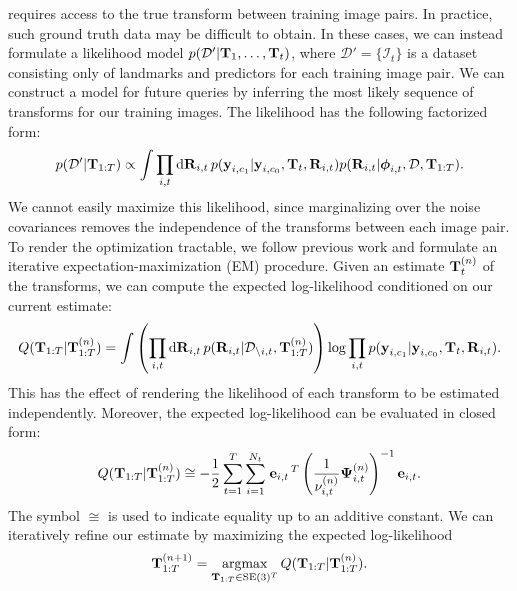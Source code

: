  requires access to the true transform between
training image pairs.  In practice, such ground truth data may be difficult
to obtain.  In these cases, we can instead formulate a likelihood model $p(\mathcal{D}' \vert
\boldsymbol{\mathbf{T}}_1, \dots, \boldsymbol{\mathbf{T}}_t)$, where $\mathcal{D}' = \{\mathcal{I}_t\}$ is a dataset consisting only of
landmarks and predictors for each training image pair. We can construct a model
for future queries by inferring the most likely sequence of transforms for our
training images.  The likelihood has the following factorized form:
\begin{equation}
  p(\mathcal{D}' \vert \boldsymbol{\mathbf{T}}_{1:T}) \propto \int \prod_{i,t}
  \mathrm{d}\boldsymbol{\mathbf{R}}_{i,t}\,
  p(\boldsymbol{\mathbf{y}}_{i, c_1} \vert \boldsymbol{\mathbf{y}}_{i, c_0}, 
    \boldsymbol{\mathbf{T}}_t, \boldsymbol{\mathbf{R}}_{i,t}) p(\boldsymbol{\mathbf{R}}_{i,t}\vert \boldsymbol{\mathbf{\phi}}_{i,t},
    \mathcal{D}, \boldsymbol{\mathbf{T}}_{1:T}).
\end{equation}
We cannot easily maximize this likelihood, since marginalizing over the
noise covariances removes the independence of the transforms between
each image pair. To render the optimization tractable, we follow previous work \citep{VegaBrown:2013fv} and formulate an iterative expectation-maximization (EM)
procedure. Given an estimate $\boldsymbol{\mathbf{T}}_{t}^{(n)}$ of the transforms, we can
compute the expected log-likelihood conditioned on our current estimate: 
\begin{equation}
  Q(\boldsymbol{\mathbf{T}}_{1:T} \vert \boldsymbol{\mathbf{T}}_{1:T}^{(n)}) = 
    \int \left(\prod_{i,t}\mathrm{d}\boldsymbol{\mathbf{R}}_{i,t}
      \,p(\boldsymbol{\mathbf{R}}_{i,t} | \mathcal{D}_{\setminus
        i,t},
      \boldsymbol{\mathbf{T}}_{1:T}^{(n)})\right) \log \prod_{i,t} p(\boldsymbol{\mathbf{y}}_{i, c_1} \vert
      \boldsymbol{\mathbf{y}}_{i, c_0}, \boldsymbol{\mathbf{T}}_t,
      \boldsymbol{\mathbf{R}}_{i,t}).
\end{equation}
This has the effect of rendering the likelihood of each transform to be
estimated independently.  Moreover, the expected log-likelihood can be
evaluated in closed form:
\begin{align}
  Q(\boldsymbol{\mathbf{T}}_{1:T} | \boldsymbol{\mathbf{T}}_{1:T}^{(n)}) \cong -\frac{1}{2}\sum_{t=1}^T
  \sum_{i=1}^{N_t} \left.{\boldsymbol{\mathbf{e}}_{i,t}}\right.^T
  \left(\frac{1}{\nu_{i,t}^{(n)}}\boldsymbol{\mathbf{\Psi}}_{i,t}^{(n)}\right)^{-1}
  \boldsymbol{\mathbf{e}}_{i,t}.
\end{align}
The symbol $\cong$ is used to indicate equality up to an additive constant. We can iteratively refine our estimate by maximizing the expected
log-likelihood
\begin{equation}
  \boldsymbol{\mathbf{T}}_{1:T}^{(n+1)} = 
    \operatorname*{argmax}_{\boldsymbol{\mathbf{T}}_{1:T}\in\text{SE}(3)^T}
    Q(\boldsymbol{\mathbf{T}}_{1:T} \vert \boldsymbol{\mathbf{T}}_{1:T}^{(n)}).
\end{equation}
